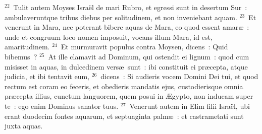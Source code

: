 ${}^{22}$~Tulit autem Moyses Isra\"el de mari Rubro, et egressi sunt in desertum Sur~: ambulaveruntque tribus diebus per solitudinem, et non inveniebant aquam.
${}^{23}$~Et venerunt in Mara, nec poterant bibere aquas de Mara, eo quod essent amar\ae~: unde et congruum loco nomen imposuit, vocans illum Mara, id est, amaritudinem.
${}^{24}$~Et murmuravit populus contra Moysen, dicens~: Quid bibemus~?
${}^{25}$~At ille clamavit ad Dominum, qui ostendit ei lignum~: quod cum misisset in aquas, in dulcedinem vers\ae\ sunt~: ibi constituit ei pr\ae cepta, atque judicia, et ibi tentavit eum,
${}^{26}$~dicens~: Si audieris vocem Domini Dei tui, et quod rectum est coram eo feceris, et obedieris mandatis ejus, custodierisque omnia pr\ae cepta illius, cunctum languorem, quem posui in \AE gypto, non inducam super te~: ego enim Dominus sanator tuus.
${}^{27}$~Venerunt autem in Elim filii Isra\"el, ubi erant duodecim fontes aquarum, et septuaginta palm\ae~: et castrametati sunt juxta aquas.

